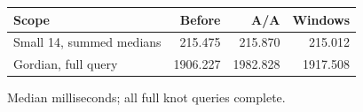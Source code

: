 \begin{center}\small
\begin{tabular}{@{}lrrr@{}}
\toprule
Scope & Before & A/A & Windows \\
\midrule
Small 14, summed medians & 215.475 & 215.870 & 215.012 \\
Gordian, full query & 1906.227 & 1982.828 & 1917.508 \\
\bottomrule
\end{tabular}
\end{center}
Median milliseconds; all full knot queries complete.
